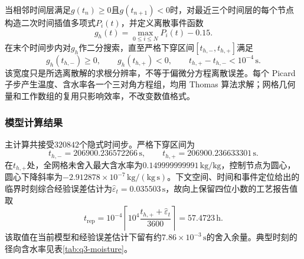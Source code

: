 \documentclass[withoutpreface,bwprint]{cumcmthesis}
\begin{document}
当相邻时间层满足$g(t_n)\ge0$且$g(t_{n+1})<0$时，对最近三个时间层的每个节点构造二次时间插值多项式$P_i(t)$，并定义离散事件函数
\begin{equation}
g_h(t)=\max_{0\le i\le N}P_i(t)-0.15.
\label{eq:q3-discrete-event}
\end{equation}
在末个时间步内对$g_h$作二分搜索，直至严格下穿区间$[t_{h,-},t_{h,+}]$满足
\begin{equation}
g_h(t_{h,-})\ge0,
\qquad
g_h(t_{h,+})<0,
\qquad
t_{h,+}-t_{h,-}<10^{-4}\,\mathrm s.
\label{eq:q3-event-bracket}
\end{equation}
该宽度只是所选离散解的求根分辨率，不等于偏微分方程离散误差。每个 Picard 子步产生温度、含水率各一个三对角方程组，均用 Thomas 算法求解；网格几何量和工作数组的复用只影响效率，不改变数值格式。


\subsubsection{模型计算结果}

主计算共接受$320842$个隐式时间步。严格下穿区间为
\begin{equation}
\boxed{
t_{h,-}=206900.236572266\,\mathrm s,
\qquad
t_{h,+}=206900.236633301\,\mathrm s.
}
\label{eq:q3-final-time}
\end{equation}
在$t_{h,+}$处，全网格未舍入最大含水率为$0.149999999991\,\mathrm{kg/kg}$，控制节点为圆心，圆心下降斜率为$-2.912878\times10^{-7}\,\mathrm{kg/(kg\,s)}$。下文空间、时间和事件定位给出的临界时刻综合经验误差估计为$\widehat\varepsilon_t=0.035503\,\mathrm s$，故向上保留四位小数的工艺报告值取
\begin{equation}
\boxed{
t_{\mathrm{rep}}
=10^{-4}\left\lceil
10^4\frac{t_{h,+}+\widehat\varepsilon_t}{3600}
\right\rceil
=57.4723\,\mathrm h.
}
\label{eq:q3-reported-time}
\end{equation}
该取值在当前模型和经验误差估计下留有约$7.86\times10^{-3}\,\mathrm s$的舍入余量。典型时刻的径向含水率见表\ref{tab:q3-moisture}。
\end{document}
